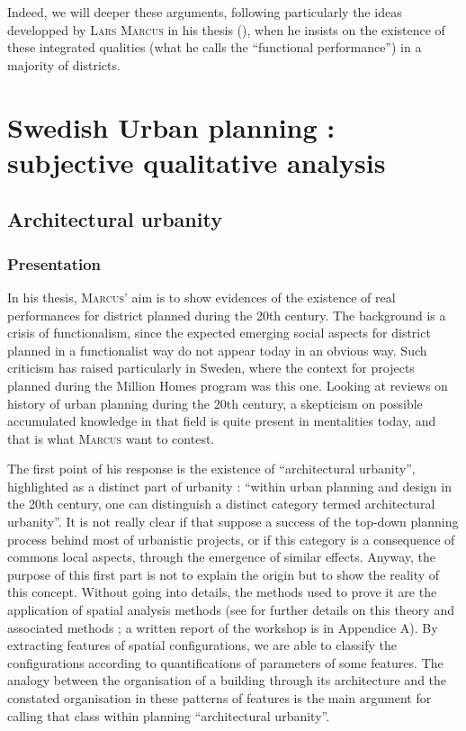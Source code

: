 \documentclass[english]{article}
\newcommand{\noun}[1]{\textsc{#1}}
\begin{document}
\bigskip{}


Indeed, we will deeper these arguments, following particularly the
ideas developped by \noun{Lars Marcus} in his thesis (\cite{marcus2000architectural}),
when he insists on the existence of these integrated qualities (what
he calls the ``functional performance'') in a majority of districts.


\section{Swedish Urban planning : subjective qualitative analysis}


\subsection{Architectural urbanity}


\subsubsection{Presentation}

In his thesis, \noun{Marcus'} aim is to show evidences of the existence
of real performances for district planned during the 20th century.
The background is a crisis of functionalism, since the expected emerging
social aspects for district planned in a functionalist way do not
appear today in an obvious way. Such criticism has raised particularly
in Sweden, where the context for projects planned during the Million
Homes program was this one. Looking at reviews on history of urban
planning during the 20th century, a skepticism on possible accumulated
knowledge in that field is quite present in mentalities today, and
that is what \noun{Marcus} want to contest.

\bigskip{}


The first point of his response is the existence of ``architectural
urbanity'', highlighted as a distinct part of urbanity : ``within
urban planning and design in the 20th century, one can distinguish
a distinct category termed architectural urbanity''. It is not really
clear if that suppose a success of the top-down planning process behind
most of urbanistic projects, or if this category is a consequence
of commons local aspects, through the emergence of similar effects.
Anyway, the purpose of this first part is not to explain the origin
but to show the reality of this concept. Without going into details,
the methods used to prove it are the application of spatial analysis
methods (see \cite{workshopArchMorph} for further details on this
theory and associated methods ; a written report of the workshop is
in Appendice A). By extracting features of spatial configurations,
we are able to classify the configurations according to quantifications
of parameters of some features. The analogy between the organisation
of a building through its architecture and the constated organisation
in these patterns of features is the main argument for calling that
class within planning ``architectural urbanity''.
\end{document}

